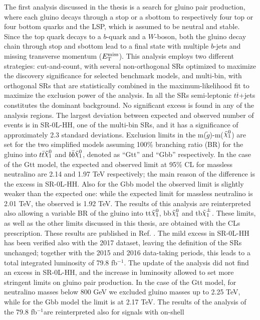 \documentclass[11pt,a4paper]{article}
\def\ifb{\mbox{fb$^{-1}$}} %
\newcommand{\met}{\ensuremath{E_{\rm T}^{\mathrm{miss}}}\xspace}
\newcommand{\ttbar}{\ensuremath{t\overline{t}}\xspace}
\newcommand*{\gluino}{\ensuremath{\tilde{g}}\xspace}
\newcommand*{\ninoone}{\ensuremath{\mathchoice%
      {\displaystyle\raise.4ex\hbox{$\displaystyle\tilde\chi^0_1$}}%
         {\textstyle\raise.4ex\hbox{$\textstyle\tilde\chi^0_1$}}%
       {\scriptstyle\raise.3ex\hbox{$\scriptstyle\tilde\chi^0_1$}}%
 {\scriptscriptstyle\raise.3ex\hbox{$\scriptscriptstyle\tilde\chi^0_1$}}}\xspace}
\newcommand*{\chinoonepm}{\ensuremath{\mathchoice%
      {\displaystyle\raise.4ex\hbox{$\displaystyle\tilde\chi^\pm_1$}}%
         {\textstyle\raise.4ex\hbox{$\textstyle\tilde\chi^\pm_1$}}%
       {\scriptstyle\raise.3ex\hbox{$\scriptstyle\tilde\chi^\pm_1$}}%
 {\scriptscriptstyle\raise.3ex\hbox{$\scriptscriptstyle\tilde\chi^\pm_1$}}}\xspace}
\begin{document}
The first analysis discussed in the thesis is a search for gluino pair production, where each gluino decays through a stop or a sbottom 
to respectively four top or four bottom quarks and the LSP, which is assumed to be neutral and stable.
Since the top quark decays to a $b$-quark and a $W$-boson, both the gluino decay chain through stop and sbottom lead to a 
final state with multiple $b$-jets and missing transverse momentum (\met). 
This analysis employs two different strategies: cut-and-count, with several non-orthogonal SRs optimized to 
maximize the discovery significance for selected benchmark models, and multi-bin, with orthogonal SRs 
that are statistically combined in the maximum-likelihood fit 
to maximize the exclusion power of the analysis. 
In all the SRs semi-leptonic \ttbar+jets constitutes the dominant background.
No significant excess is found in any of the analysis regions. 
The largest deviation between expected and observed number of events 
is in SR-0L-HH, one of the multi-bin SRs, and it has a significance of approximately 
2.3 standard deviations. 
Exclusion limits in the m(\gluino)-m(\ninoone) are set for the two simplified models assuming 
100\% branching ratio (BR) for the gluino into $t\bar{t}\ninoone$ and $b\bar{b}\ninoone$, denoted as ``Gtt'' and ``Gbb'' respectively.
In the case of the Gtt model, the expected and observed limit at 95\% CL for massless neutralino 
are 2.14 and 1.97 TeV respectively; the main reason of the difference is the excess in SR-0L-HH.
Also for the Gbb model the observed limit is slightly weaker than the expected one: 
while the expected limit for massless neutralino is 2.01 TeV, the observed is 1.92 TeV.
The results of this analysis are reinterpreted also allowing a variable BR of the gluino 
into tt\ninoone, bb\ninoone and tb\chinoonepm. 
These limits, as well as the other limits discussed in this thesis, are obtained with the CLs 
prescription. These results are published in Ref. \cite{Aaboud:2017hrg}. 
The mild excess in SR-0L-HH has been verified also with the 2017 dataset,
leaving the definition of the SRs unchanged; 
together with the 2015 and 2016 data-taking periods, this leads to a total integrated luminosity 
of 79.8 \ifb. 
The update of the analysis did not find an excess in SR-0L-HH, and the increase in luminosity 
allowed to set more stringent limits on gluino pair production. 
In the case of the Gtt model, for neutralino masses below 800 GeV we excluded gluino masses up to 
2.25 TeV, while for the Gbb model the limit is at 2.17 TeV. 
The results of the analysis of the 79.8 \ifb are reinterpreted also for signals with on-shell 
\end{document}
